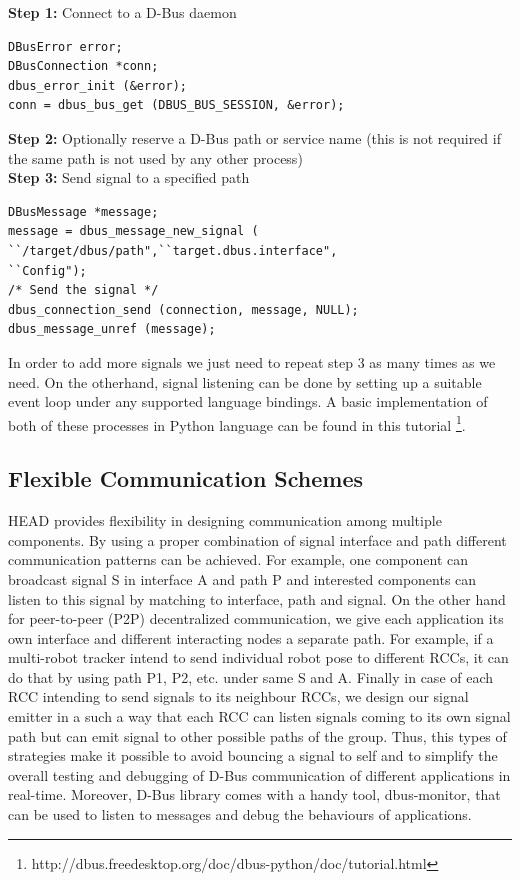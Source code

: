\documentclass{ifacconf}
\begin{document}
\textbf{Step 1:} Connect to a D-Bus daemon
\lstset{language=C,basicstyle=\small}
\begin{lstlisting}
DBusError error;
DBusConnection *conn;
dbus_error_init (&error);
conn = dbus_bus_get (DBUS_BUS_SESSION, &error);
\end{lstlisting}
\textbf{Step 2:} Optionally reserve a D-Bus path or service name (this is not required if the same path is not used by any other process)\\
\textbf{Step 3:} Send signal to a specified path
\begin{lstlisting} 
DBusMessage *message;
message = dbus_message_new_signal (
``/target/dbus/path",``target.dbus.interface",
``Config");
/* Send the signal */
dbus_connection_send (connection, message, NULL);
dbus_message_unref (message);
\end{lstlisting}
In order to add more signals we just need to repeat step 3 as many times as we need. On the otherhand, signal listening can be done by setting up a suitable event loop under any supported language bindings. A basic implementation of both of these processes in Python language can be found in this tutorial \footnote{http://dbus.freedesktop.org/doc/dbus-python/doc/tutorial.html}. 
\subsection{Flexible Communication  Schemes}
HEAD provides flexibility in designing communication among multiple components. By using a proper combination of signal interface and path different communication patterns can be achieved. For example, one component can broadcast signal S in interface A and path P and interested components can listen to this signal by matching to interface, path and signal. On the other hand for peer-to-peer (P2P) decentralized communication,  we give each application its own interface and different interacting nodes a separate path.  For example, if a multi-robot tracker intend to send individual robot pose to different RCCs, it can do that by using path P1,  P2, etc. under same S and A. Finally in case of each RCC intending to send signals to its neighbour RCCs, we design our signal emitter in a such a way that each RCC can listen signals coming to its own signal path but can emit  signal to other possible paths of the group. Thus,  this types of strategies  make it possible to avoid bouncing a signal to self and to simplify the overall testing and debugging of D-Bus communication of different applications in real-time. Moreover, D-Bus library comes with a handy tool, dbus-monitor, that can be used to listen to messages and debug the behaviours of applications.
\end{document}
